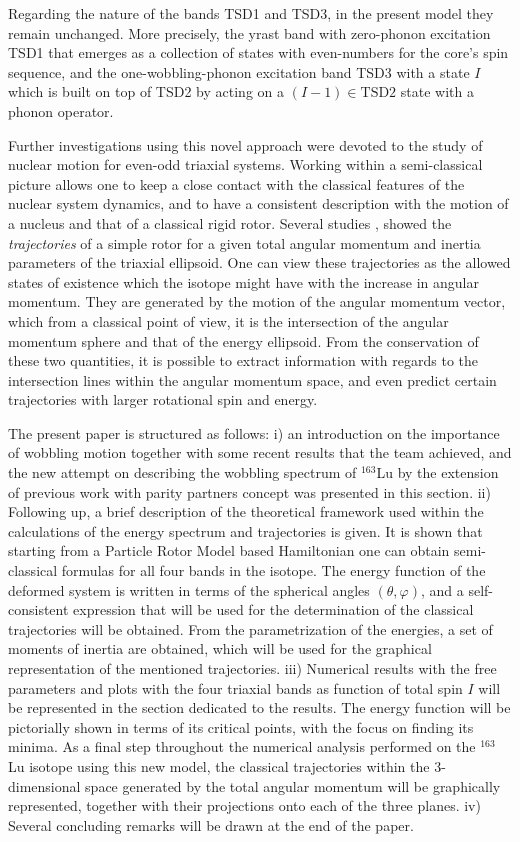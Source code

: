 \documentclass[%
 reprint,
 amsmath,
 amssymb,
 aps,
]{revtex4-2}
\begin{document}
Regarding the nature of the bands TSD1 and TSD3, in the present model they remain unchanged. More precisely, the yrast band with zero-phonon excitation TSD1 that emerges as a collection of states with even-numbers for the core's spin sequence, and the one-wobbling-phonon excitation band TSD3 with a state $I$ which is built on top of TSD2 by acting on a $(I-1)\in \text{TSD2}$ state with a phonon operator.

Further investigations using this novel approach were devoted to the study of nuclear motion for even-odd triaxial systems. Working within a semi-classical picture allows one to keep a close contact with the classical features of the nuclear system dynamics, and to have a consistent description with the motion of a nucleus and that of a classical rigid rotor. Several studies \cite{frauendorf2014transverse}, \cite{lawrie2020tilted} showed the \emph{trajectories} of a simple rotor for a given total angular momentum and inertia parameters of the triaxial ellipsoid. One can view these trajectories as the allowed states of existence which the isotope might have with the increase in angular momentum. They are generated by the motion of the angular momentum vector, which from a classical point of view, it is the intersection of the angular momentum sphere and that of the energy ellipsoid. From the conservation of these two quantities, it is possible to extract information with regards to the intersection lines within the angular momentum space, and even predict certain trajectories with larger rotational spin and energy.
 
The present paper is structured as follows: i) an introduction on the importance of wobbling motion together with some recent results that the team achieved, and the new attempt on describing the wobbling spectrum of $^{163}$Lu by the extension of previous work with parity partners concept was presented in this section. ii) Following up, a brief description of the theoretical framework used within the calculations of the energy spectrum and trajectories is given. It is shown that starting from a Particle Rotor Model based Hamiltonian one can obtain semi-classical formulas for all four bands in the isotope. The energy function of the deformed system is written in terms of the spherical angles $(\theta,\varphi)$, and a self-consistent expression that will be used for the determination of the classical trajectories will be obtained. From the parametrization of the energies, a set of moments of inertia are obtained, which will be used for the graphical representation of the mentioned trajectories. iii) Numerical results with the free parameters and plots with the four triaxial bands as function of total spin $I$ will be represented in the section dedicated to the results. The energy function will be pictorially shown in terms of its critical points, with the focus on finding its minima. As a final step throughout the numerical analysis performed on the $^{163}$Lu isotope using this new model, the classical trajectories within the 3-dimensional space generated by the total angular momentum will be graphically represented, together with their projections onto each of the three planes. iv) Several concluding remarks will be drawn at the end of the paper.
\end{document}
